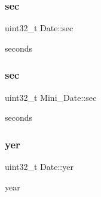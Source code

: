 \subsubsection{\texorpdfstring{sec}{sec}\hspace{0.1cm}{\footnotesize\ttfamily [1/2]}}
{\footnotesize\ttfamily uint32\+\_\+t Date\+::sec}



seconds 

\mbox{\label{group__rtc_gaf04de8c74857b4c272fab97e2c86c6e5}} 
\subsubsection{\texorpdfstring{sec}{sec}\hspace{0.1cm}{\footnotesize\ttfamily [2/2]}}
{\footnotesize\ttfamily uint32\+\_\+t Mini\+\_\+\+Date\+::sec}



seconds 

\mbox{\label{group__rtc_ga8bc3e3b0d57e50d6d4c62f76922de55e}} 
\subsubsection{\texorpdfstring{yer}{yer}}
{\footnotesize\ttfamily uint32\+\_\+t Date\+::yer}



year 

